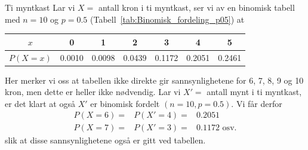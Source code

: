 \begin{eksempel}{Ti myntkast}
Lar vi $X=$ antall kron i ti myntkast, ser vi av en binomisk
tabell med $n=10$ og $p=0.5$ (Tabell~\ref{tab:Binomisk_fordeling_p05}) at
\begin{center}
\begin{tabular}{c|cccccc}
   $x$   &   0   &    1   &    2   &    3   &    4   &    5\\ \hline
$P(X=x)$& 0.0010 & 0.0098 & 0.0439 & 0.1172 & 0.2051 & 0.2461
\end{tabular}
\end{center}
\noindent Her merker vi oss at tabellen ikke direkte gir sannsynlighetene
for 6, 7, 8, 9 og 10 kron, men dette er heller ikke nødvendig.
Lar vi $X'=$ antall mynt i ti myntkast, er det klart at også $X'$
er binomisk fordelt $(n=10,p=0.5)$. Vi får derfor
\begin{eqnarray*}
     P(X=6)=&P(X'=4)=&0.2051 \\
     P(X=7)=&P(X'=3)=&0.1172 \mbox{\ \ osv.}
\end{eqnarray*}
\noindent slik at disse sannsynlighetene også er gitt ved tabellen.
\end{eksempel}

